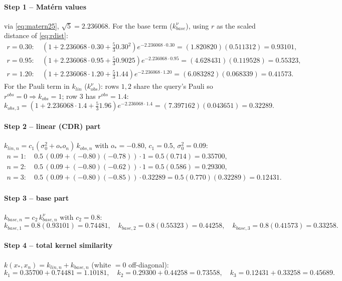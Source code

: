 \documentclass[11pt]{article}
\def\bm#1{#1}%
\def\mathrm#1{#1}%
\begin{document}
\paragraph{Step 1 -- Mat\'ern values} via \eqref{eq:matern25}, $\sqrt5=2.236068$.
For the base term ($k^{\nu}_{\mathrm{base}}$), using $r$ as the scaled distance of
\eqref{eq:rdist}:
\[
\begin{aligned}
r{=}0.30:&\ (1+2.236068\!\cdot\!0.30+\tfrac53 0.30^2)e^{-2.236068\cdot0.30}
=(1.820820)(0.511312)=0.93101,\\
r{=}0.95:&\ (1+2.236068\!\cdot\!0.95+\tfrac53 0.9025)e^{-2.236068\cdot0.95}=(4.628431)(0.119528)=0.55323,\\
r{=}1.20:&\ (1+2.236068\!\cdot\!1.20+\tfrac53 1.44)e^{-2.236068\cdot1.20}=(6.083282)(0.068339)=0.41573.
\end{aligned}
\]
For the Pauli term in $k_{\mathrm{lin}}$ ($k^{\nu}_{\mathrm{obs}}$): rows $1,2$
share the query's Pauli so $r^{\mathrm{obs}}=0\Rightarrow k_{\mathrm{obs}}=1$;
row $3$ has $r^{\mathrm{obs}}=1.4$:
\[
k_{\mathrm{obs},3}=(1+2.236068\!\cdot\!1.4+\tfrac53 1.96)e^{-2.236068\cdot1.4}
=(7.397162)(0.043651)=0.32289.
\]

\paragraph{Step 2 -- linear (CDR) part} $k_{\mathrm{lin},n}=c_1(\sigma_0^2+o_*
o_n)\,k_{\mathrm{obs},n}$ with $o_*=-0.80$, $c_1=0.5$, $\sigma_0^2=0.09$:
\[
\begin{aligned}
n{=}1:&\ 0.5\,(0.09+(-0.80)(-0.78))\cdot1=0.5(0.714)=0.35700,\\
n{=}2:&\ 0.5\,(0.09+(-0.80)(-0.62))\cdot1=0.5(0.586)=0.29300,\\
n{=}3:&\ 0.5\,(0.09+(-0.80)(-0.85))\cdot0.32289=0.5(0.770)(0.32289)=0.12431.
\end{aligned}
\]

\paragraph{Step 3 -- base part} $k_{\mathrm{base},n}=c_2\,k^{\nu}_{\mathrm{base},n}$
with $c_2=0.8$:
\[
k_{\mathrm{base},1}=0.8(0.93101)=0.74481,\quad
k_{\mathrm{base},2}=0.8(0.55323)=0.44258,\quad
k_{\mathrm{base},3}=0.8(0.41573)=0.33258.
\]

\paragraph{Step 4 -- total kernel similarity} $k(\bm x_*,\bm x_n)=
k_{\mathrm{lin},n}+k_{\mathrm{base},n}$ (white $=0$ off-diagonal):
\[
k_1=0.35700+0.74481=1.10181,\quad
k_2=0.29300+0.44258=0.73558,\quad
k_3=0.12431+0.33258=0.45689.
\]
\end{document}
